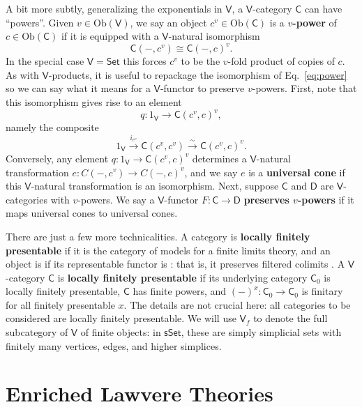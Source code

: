 \documentclass{amsart}
\newcommand{\define}[1]{{\bf \boldmath{#1}}}
\theoremstyle{definition}
\newcommand{\sSet}{\mathsf{sSet}}
\newcommand{\Set}{\mathsf{Set}}
\newcommand{\V}{\mathsf{V}}
\newcommand{\D}{\mathsf{D}}
\newcommand{\C}{\mathsf{C}}
\newcommand{\Obj}{\mathrm{Ob}}
\newcommand{\maps}{\colon}
\begin{document}
A bit more subtly, generalizing the exponentials in $\V$, a $\V$-category $\C$ can have ``powers''.    Given $v \in \Obj(\V)$, we say an object $c^v \in \Obj(\C)$ is a \textbf{$v$-power} of $c \in \Obj(\C)$ if it is equipped with a $\V$-natural isomorphism
\begin{equation}
\label{eq:power}
 \C(-,c^v) \cong \C(-,c)^v.
\end{equation}
In the special case $\V = \Set$  this forces $c^v$ to be the $v$-fold product of copies of $c$.  %
As with $\V$-products, it is useful to repackage the isomorphism of Eq.\ \eqref{eq:power} so we can say what it means for a $\V$-functor to preserve $v$-powers.   First, note that this isomorphism gives rise to an element 
\[     q \maps 1_\V \to  \C(c^v,c)^v , \]
namely the composite
\[ 1_\V \stackrel{i_{c^v}}{\longrightarrow}  \C(c^v,c^v) \stackrel{\sim}{\longrightarrow} \C(c^v,c)^v .\]
Conversely, any element $q \maps 1_\V \to  \C(c^v,c)^v$ determines a $\V$-natural transformation $e\maps C(-,c^v) \to C(-,c)^v$, and we say $e$ is a \textbf{universal cone} if this $\V$-natural transformation is an isomorphism.  Next, suppose $\C$ and $\D$ are $\V$-categories with $v$-powers.  We say a $\V$-functor $F\maps \C\to \D$ \textbf{preserves $v$-powers} if it maps universal cones to universal cones.

There are just a few more technicalities. A category is \textbf{locally finitely presentable} if it is the category of models for a finite limits theory, and an object is \define{finite} if its representable functor is \define{finitary}: that is, it preserves filtered colimits \cite{adamekrosicky}.   A $\V$-category $\C$ is \textbf{locally finitely presentable} if its underlying category $\C_0$ is locally finitely presentable, $\C$ has finite powers, and $(-)^x\maps \C_0 \to \C_0$ is finitary for all finitely presentable $x$.  The details are not crucial here: all categories to be considered are locally finitely presentable. We will use  $\V_f$ to denote the full subcategory of $\V$ of finite objects: in $\sSet$, these are simply simplicial sets with finitely many vertices, edges, and higher simplices.

\section{Enriched Lawvere Theories}
\label{sec:enriched_lawvere}
\end{document}
